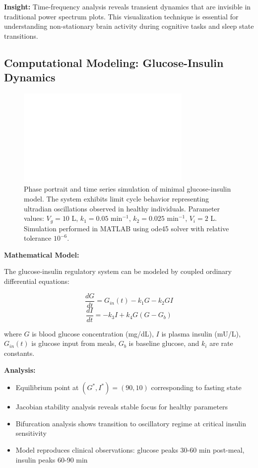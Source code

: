 \textbf{Insight:} Time-frequency analysis reveals transient dynamics that are invisible in traditional power spectrum plots. This visualization technique is essential for understanding non-stationary brain activity during cognitive tasks and sleep state transitions.

\newpage


\subsection*{Computational Modeling: Glucose-Insulin Dynamics}

\begin{figure}[h]
\centering
\includegraphics[width=0.75\textwidth]{assets/placeholder_1600x900.png}
\caption{Phase portrait and time series simulation of minimal glucose-insulin model. The system exhibits limit cycle behavior representing ultradian oscillations observed in healthy individuals. Parameter values: $V_g = 10$ L, $k_1 = 0.05$ min$^{-1}$, $k_2 = 0.025$ min$^{-1}$, $V_i = 2$ L. Simulation performed in MATLAB using ode45 solver with relative tolerance $10^{-6}$.}
\end{figure}

\textbf{Mathematical Model:}

The glucose-insulin regulatory system can be modeled by coupled ordinary differential equations:

\[
\frac{dG}{dt} = G_{in}(t) - k_1 G - k_2 G I
\]
\[
\frac{dI}{dt} = -k_3 I + k_4 G (G - G_b)
\]

where $G$ is blood glucose concentration (mg/dL), $I$ is plasma insulin (mU/L), $G_{in}(t)$ is glucose input from meals, $G_b$ is baseline glucose, and $k_i$ are rate constants.

\textbf{Analysis:}
\begin{itemize}[leftmargin=1.2em, itemsep=0.1em]
  \item Equilibrium point at $(G^*, I^*) = (90, 10)$ corresponding to fasting state
  \item Jacobian stability analysis reveals stable focus for healthy parameters
  \item Bifurcation analysis shows transition to oscillatory regime at critical insulin sensitivity
  \item Model reproduces clinical observations: glucose peaks 30-60 min post-meal, insulin peaks 60-90 min
\end{itemize}

